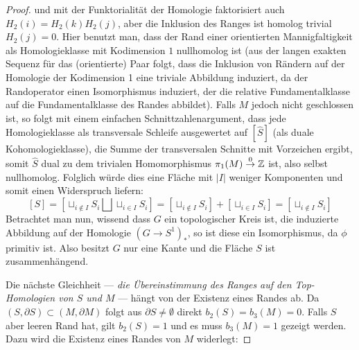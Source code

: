 \begin{proof}
	 und mit der Funktorialität der Homologie faktorisiert auch $H_2(i)=H_2(k)H_2(j)$, aber die Inklusion des Ranges ist homolog trivial $H_2(j)=0$. Hier benutzt man, dass der Rand einer orientierten Mannigfaltigkeit als Homologieklasse mit Kodimension $1$ nullhomolog ist (aus der langen exakten Sequenz für das (orientierte) Paar folgt, dass die Inklusion von Rändern auf der Homologie der Kodimension 1 eine triviale Abbildung induziert, da der Randoperator einen Isomorphismus induziert, der die relative Fundamentalklasse auf die Fundamentalklasse des Randes abbildet). Falls $M$ jedoch nicht geschlossen ist, so folgt mit einem einfachen Schnittzahlenargument, dass jede Homologieklasse als transversale Schleife ausgewertet auf $[\hat S]$ (als duale Kohomologieklasse), die Summe der transversalen Schnitte mit Vorzeichen ergibt, somit $\hat S$ dual zu dem trivialen Homomorphismus $\pi_1(M) \stackrel 0\to \mathbb{Z}$ ist, also selbst nullhomolog. Folglich würde dies eine Fläche mit $|I|$ weniger Komponenten und somit einen Widerspruch liefern:
	 \[
	 	[S]=[\sqcup_{i\not \in I} S_i\bigsqcup \sqcup_{i\in I} S_i] = [\sqcup_{i\not \in I} S_i ]+[ \sqcup_{i\in I} S_i] = [\sqcup_{i\not \in I}S_i]
	 \]
	 Betrachtet man nun, wissend dass $G$ ein topologischer Kreis ist, die induzierte Abbildung auf der Homologie $(G\to S^1)_*$, so ist diese ein Isomorphismus, da $\phi$ primitiv ist. Also besitzt $G$ nur eine Kante und die Fläche $S$ ist zusammenhängend.

	 Die nächste Gleichheit --- \emph{die Übereinstimmung des Ranges auf den Top-Homologien von $S$ und $M$} --- hängt von der Existenz eines Randes ab. Da $(S,\partial S) \subset (M,\partial M)$ folgt aus $\partial S \neq \emptyset$ direkt $b_2(S)=b_3(M)=0$. Falls $S$ aber leeren Rand hat, gilt $b_2(S)=1$ und es muss $b_3(M)=1$ gezeigt werden. Dazu wird die Existenz eines Randes von $M$ widerlegt:


\end{proof}

